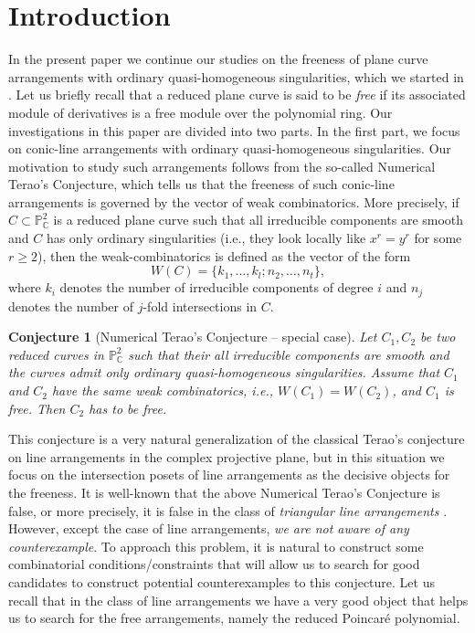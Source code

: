 \documentclass[12pt]{article}
\theoremstyle{plain}
\newtheorem{conjecture}[thm]{Conjecture}
\theoremstyle{definition}
\begin{document}
\section{Introduction}
In the present paper we continue our studies on the freeness of plane curve arrangements with ordinary quasi-homogeneous singularities, which we started in \cite{PP2023, PP2024}. Let us briefly recall that a reduced plane curve is said to be {\it free} if its associated module of derivatives is a free module over the polynomial ring. Our investigations in this paper are divided into two parts. In the first part, we focus on conic-line arrangements with ordinary quasi-homogeneous singularities. Our motivation to study such arrangements follows from the so-called Numerical Terao's Conjecture, which tells us that the freeness of such conic-line arrangements is governed by the vector of weak combinatorics. More precisely, if $C \subset \mathbb{P}^{2}_{\mathbb{C}}$ is a reduced plane curve such that all irreducible components are smooth and $C$ has only ordinary singularities (i.e., they look locally like $x^{r} = y^{r}$ for some $r\geq 2$), then the weak-combinatorics is defined as the vector of the form
\[W(C) = \{k_{1}, \ldots , k_{l}; n_{2}, \ldots , n_{t}\},\]
where $k_{i}$ denotes the number of irreducible components of degree $i$ and $n_{j}$ denotes the number of $j$-fold intersections in $C$.
\begin{conjecture}[Numerical Terao's Conjecture -- special case]
Let $C_{1}, C_{2}$ be two reduced curves in $\mathbb{P}^{2}_{\mathbb{C}}$ such that their all irreducible components are smooth and the curves admit only ordinary quasi-homogeneous singularities. Assume that $C_{1}$ and $C_{2}$ have the same weak combinatorics, i.e., $W(C_{1}) = W(C_{2})$, and $C_{1}$ is free. Then $C_{2}$ has to be free.
\end{conjecture}
This conjecture is a very natural generalization of the classical Terao's conjecture on line arrangements in the complex projective plane, but in this situation we focus on the intersection posets of line arrangements as the decisive objects for the freeness. It is well-known that the above Numerical Terao's Conjecture is false, or more precisely, it is false in the class of \textit{triangular line arrangements} \cite{Mar}. However, except the case of line arrangements, \textit{we are not aware of any counterexample}. To approach this problem, it is natural to construct some combinatorial conditions/constraints that will allow us to search for good candidates to construct potential counterexamples to this conjecture. Let us recall that in the class of line arrangements we have a very good object that helps us to search for the free arrangements, namely the reduced Poincar\'e polynomial.
\end{document}
